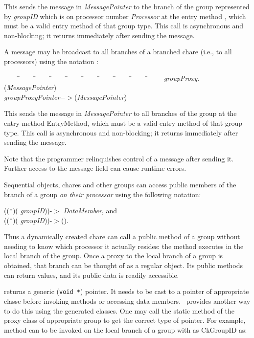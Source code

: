 This sends the message in {\it MessagePointer} to the branch of
the group represented by {\it groupID} which is on processor number {\it
Processor} at the entry method , which must be a valid entry
method of that group type. This call is asynchronous and non-blocking; it
returns immediately after sending the message.

A message may be broadcast  to all branches of a branched
chare (i.e., to all processors) using the notation :

\begin{tabbing} ~~~~ \=~~~~ \=~~~~ \=~~~~ \=~~~~ \=~~~~ \=~~~~ \=~~~~ \=~~~~
\=~~~~ \kill \> {\it groupProxy}$.$({\it MessagePointer}) \\ \>
{\it groupProxyPointer}$->$({\it MessagePointer}) \end{tabbing}

This sends the message in {\it MessagePointer} to all branches of the group at
the entry method {\sf EntryMethod}, which must be a valid entry method of that
group type. This call is asynchronous and non-blocking; it returns immediately
after sending the message.

Note that the programmer relinquishes control of a message after sending it.
Further access to the message field can cause runtime errors.


Sequential objects, chares and other groups can access public members of the
branch of a group  {\it on their processor} using
the following notation:

((*)( {\it groupID}))-$>${\it
DataMember}, and \\ ((*)( {\it
groupID}))-$>$(). 

Thus a dynamically created chare can call a public method of a
group without needing to know which processor it actually resides: the method
executes in the local branch of the group.  Once a proxy to the local branch of a group is obtained, that branch can be thought of as a regular object.  Its public methods can return values, and its public data is readily accessible.   

 returns a generic ({\tt void
*}) pointer.  It needs to be
cast to a pointer of appropriate classe before invoking methods or
accessing data members. \charmpp\ provides another way to do this using
the generated
 classes. One may call the static method
 of the proxy class of appropriate
group to get the correct type of pointer.  For
example, method  can to be invoked on the local branch of
a group  with  as CkGroupID as:

